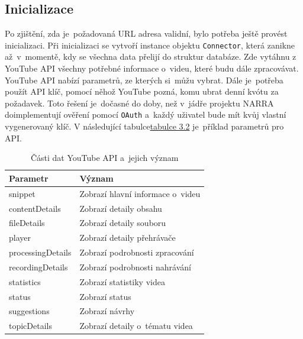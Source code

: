 \subsection{Inicializace}
\par Po zjištění, zda je~požadovaná URL adresa validní, bylo potřeba ještě provést inicializaci. Při inicializaci se vytvoří instance objektu \texttt{Connector}, která zanikne až~v~momentě, kdy se všechna data přelijí do struktur databáze. Zde vytáhnu z YouTube API všechny potřebné informace o~videu, které budu dále zpracovávat. YouTube API nabízí parametrů, ze kterých si~můžu vybrat. Dále je~potřeba použít API klíč\cite{apistart}, pomocí něhož YouTube pozná, komu ubrat denní kvótu za požadavek. Toto řešení je~dočasné do doby, než v~jádře projektu NARRA doimplementují ověření pomocí \texttt{OAuth} a~každý uživatel bude mít kvůj vlastní vygenerovaný klíč. V následující tabulce\hyperlink{apiparams}{tabulce 3.2} je~příklad parametrů pro API.

\begin{table}[h!]
\hypertarget{apiparams}{}
\centering
\begin{tabular}{| l | l |}
\hline
\textbf{Parametr} & \textbf{Význam} \\
\hline
snippet & Zobrazí hlavní informace o~videu \\
\hline
contentDetails & Zobrazí detaily obsahu \\
\hline
fileDetails & Zobrazí detaily souboru \\
\hline
player & Zobrazí detaily přehrávače \\
\hline
processingDetails & Zobrazí podrobnosti zpracování \\
\hline
recordingDetails & Zobrazí podrobnosti nahrávání \\
\hline
statistics & Zobrazí statistiky videa \\
\hline
status & Zobrazí status \\
\hline
suggestions & Zobrazí návrhy \\
\hline
topicDetails & Zobrazí detaily o~tématu videa \\
\hline
\end{tabular}
\caption[Části dat YouTube API a~jejich význam]{Části dat YouTube API a~jejich význam}
\end{table}

